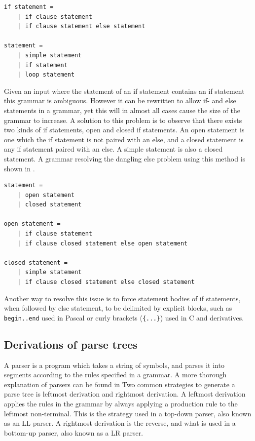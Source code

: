 \begin{lstlisting}[caption={An example of a \acrshort{cfg} describing an if statement. \citep{danglingelse}},frame=tlrb,label={lst:danglingelseex1},numbers=none]
if statement =
    | if clause statement
    | if clause statement else statement

statement =
    | simple statement
    | if statement
    | loop statement
\end{lstlisting}

Given an input where the statement of an if statement contains an if statement this grammar is ambiguous.  
However it can be rewritten to allow if- and else statements in a grammar, yet this will in almost all cases cause the size of the grammar to increase. 
A solution to this problem is to observe that there exists two kinds of if statements, open and closed if statements.
An open statement is one which the if statement is not paired with an else, and a closed statement is any if statement paired with an else.
A simple statement is also a closed statement.
A grammar resolving the dangling else problem using this method is shown in .

\begin{lstlisting}[caption={An example of a \acrshort{cfg} describing an if statement, that is not ambiguous. \citep{danglingelse}},frame=tlrb,label={lst:danglingelseex2},numbers=none]
statement =
    | open statement
    | closed statement

open statement =
    | if clause statement
    | if clause closed statement else open statement

closed statement =
    | simple statement
    | if clause closed statement else closed statement
\end{lstlisting}

Another way to resolve this issue is to force statement bodies of if statements, when followed by else statement, to be delimited by explicit blocks, such as \texttt{begin..end} used in Pascal or curly brackets (\texttt{\{...\}}) used in C and derivatives. 

\subsection{Derivations of parse trees}\label{sec:parsetrees}
A parser is a program which takes a string of symbols, and parses it into segments according to the rules specified in a grammar.
A more thorough explanation of parsers can be found in 
Two common strategies to generate a parse tree is leftmost derivation and rightmost derivation. 
A leftmost derivation applies the rules in the grammar by always applying a production rule to the leftmost non-terminal. 
This is the strategy used in a top-down parser, also known as an LL parser.
A rightmost derivation is the reverse, and what is used in a bottom-up parser, also known as a LR parser. 

